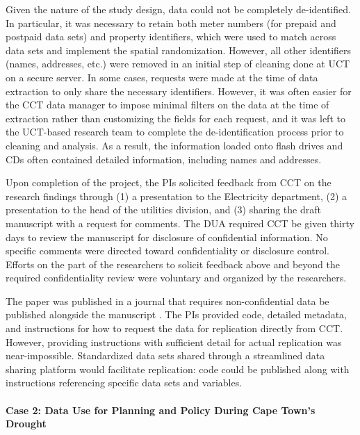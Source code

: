 \documentclass[
]{WileySix}
\begin{document}
Given the nature of the study design, data could not be completely de-identified. In particular, it was necessary to retain both meter numbers (for prepaid and postpaid data sets) and property identifiers, which were used to match across data sets and implement the spatial randomization. However, all other identifiers (names, addresses, etc.) were removed in an initial step of cleaning done at UCT on a secure server. In some cases, requests were made at the time of data extraction to only share the necessary identifiers. However, it was often easier for the CCT data manager to impose minimal filters on the data at the time of extraction rather than customizing the fields for each request, and it was left to the UCT-based research team to complete the de-identification process prior to cleaning and analysis. As a result, the information loaded onto flash drives and CDs often contained detailed information, including names and addresses.

Upon completion of the project, the PIs solicited feedback from CCT on the research findings through (1) a presentation to the Electricity department, (2) a presentation to the head of the utilities division, and (3) sharing the draft manuscript with a request for comments. The DUA required CCT be given thirty days to review the manuscript for disclosure of confidential information. No specific comments were directed toward confidentiality or disclosure control. Efforts on the part of the researchers to solicit feedback above and beyond the required confidentiality review were voluntary and organized by the researchers.

The paper was published in a journal that requires non-confidential data be published alongside the manuscript \citep{jack2020}. The PIs provided code, detailed metadata, and instructions for how to request the data for replication directly from CCT. However, providing instructions with sufficient detail for actual replication was near-impossible. Standardized data sets shared through a streamlined data sharing platform would facilitate replication: code could be published along with instructions referencing specific data sets and variables.

\hypertarget{case-2-data-use-for-planning-and-policy-during-cape-towns-drought}{%
\paragraph{Case 2: Data Use for Planning and Policy During Cape Town's Drought}\label{case-2-data-use-for-planning-and-policy-during-cape-towns-drought}}
\end{document}
